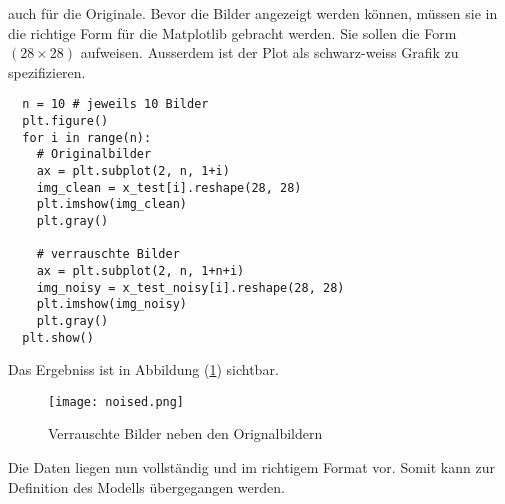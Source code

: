 auch für die Originale.
Bevor die Bilder angezeigt werden können, müssen sie in die richtige Form für
die Matplotlib gebracht werden. Sie sollen die Form $(28 \times 28)$ aufweisen.
Ausserdem ist der Plot als schwarz-weiss Grafik zu spezifizieren.
\begin{verbatim}
  n = 10 # jeweils 10 Bilder
  plt.figure()
  for i in range(n):
    # Originalbilder
    ax = plt.subplot(2, n, 1+i)
    img_clean = x_test[i].reshape(28, 28)
    plt.imshow(img_clean)
    plt.gray()

    # verrauschte Bilder
    ax = plt.subplot(2, n, 1+n+i)
    img_noisy = x_test_noisy[i].reshape(28, 28)
    plt.imshow(img_noisy)
    plt.gray()
  plt.show()
\end{verbatim}

Das Ergebniss ist in Abbildung (\ref{fig:noisy_clean_mnist}) sichtbar.
\begin{figure}[h!]
  \centering
  \texttt{[image: noised.png]}
  \caption{Verrauschte Bilder neben den Orignalbildern}
  \label{fig:noisy_clean_mnist}
\end{figure}
\para{}
Die Daten liegen nun vollständig und im richtigem Format vor.
Somit kann zur Definition des Modells übergegangen werden.

